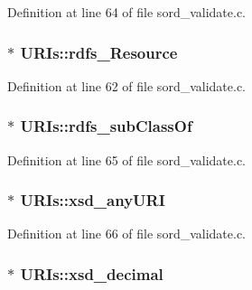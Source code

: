 Definition at line 64 of file sord\+\_\+validate.\+c.

\subsubsection[{\texorpdfstring{rdfs\+\_\+\+Resource}{rdfs_Resource}}]{$\ast$ U\+R\+Is\+::rdfs\+\_\+\+Resource}\hypertarget{struct_u_r_is_a8d1384fb4b6eba277a01508e32f2366c}{}\label{struct_u_r_is_a8d1384fb4b6eba277a01508e32f2366c}


Definition at line 62 of file sord\+\_\+validate.\+c.

\subsubsection[{\texorpdfstring{rdfs\+\_\+sub\+Class\+Of}{rdfs_subClassOf}}]{$\ast$ U\+R\+Is\+::rdfs\+\_\+sub\+Class\+Of}\hypertarget{struct_u_r_is_aa09faad114ec13cf57cd34954077d8eb}{}\label{struct_u_r_is_aa09faad114ec13cf57cd34954077d8eb}


Definition at line 65 of file sord\+\_\+validate.\+c.

\subsubsection[{\texorpdfstring{xsd\+\_\+any\+U\+RI}{xsd_anyURI}}]{$\ast$ U\+R\+Is\+::xsd\+\_\+any\+U\+RI}\hypertarget{struct_u_r_is_a348c39c501d45c04a5916d3ceaa870c7}{}\label{struct_u_r_is_a348c39c501d45c04a5916d3ceaa870c7}


Definition at line 66 of file sord\+\_\+validate.\+c.

\subsubsection[{\texorpdfstring{xsd\+\_\+decimal}{xsd_decimal}}]{$\ast$ U\+R\+Is\+::xsd\+\_\+decimal}\hypertarget{struct_u_r_is_ad5e4a3f86d9300ee688829c3ca15eb94}{}\label{struct_u_r_is_ad5e4a3f86d9300ee688829c3ca15eb94}



